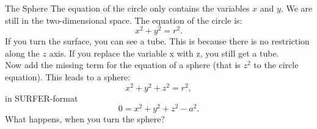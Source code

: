 \begin{surferPage}[Sphere]{The Sphere}
The equation of the circle only contains the variables $x$ and $y$. We are still in the two-dimensional space.
The equation of the circle is:
\[x^2+y^2=r^2.\]
If you turn the surface, you can see a tube. This is because there is no restriction along the $z$ axis. If you replace the variable x with z, you still get a tube.\\
Now add the missing term for the equation of a sphere (that is $z^2$ to the circle equation). 
This leads to a sphere:
\[x^2+y^2+z^2=r^2,\]
in SURFER-format
\[0=x^2+y^2+z^2-a^2.\]
What happens, when you turn the sphere?
\end{surferPage}
